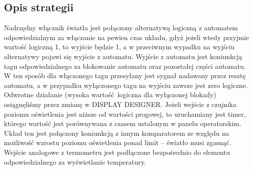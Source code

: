 \documentclass[a4paper, 12pt]{article}
\begin{document}
		\subsection{Opis strategii}
			Nadrzędny włącznik światła jest połączony alternatywą logiczną z automatem odpowiedzialnym za włączanie na pewien czas układu, gdyż jeżeli wtedy przyjmie wartość logiczną 1, to wyjście będzie 1, a w przeciwnym wypadku na wyjściu alternatywy pojawi się wyjście z automatu.
			\newline 
			\newline 
			Wyjście z automatu jest koniunkcją tagu odpowiedzialnego za blokowanie automatu oraz pozostałej części automatu. W ten sposób dla włączonego tagu przesyłany jest sygnał nadawany przez resztę automatu, a w przypadku wyłączonego tagu na wyjściu zawsze jest zero logiczne. Odwrotne działanie (wysoka wartość logiczna dla wyłączonej blokady) osiągnęliśmy przez zmianę w DISPLAY DESIGNER.
			\newline 
			\newline
			Jeżeli wejście z czujnika poziomu oświetlenia jest niższe od wartości progowej, to uruchamiany jest timer, którego wartość jest porównywana z czasem ustalonym w panelu operatorskim. Układ ten jest połączony koniunkcją z innym komparatorem ze względu na możliwość wzrostu poziomu oświetlenia ponad limit -- światło musi zgasnąć.
			\newline 
			\newline
			Wejście analogowe z termometru jest podłączone bezpośrednio do elementu odpowiedzialnego za wyświetlanie temperatury.
\end{document}
